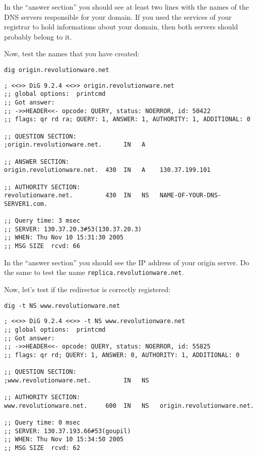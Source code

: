 \documentclass[10pt,a4paper]{article}
\makeatletter
\newenvironment{p}{\@open{P}{}}{\@close{P}}
\newenvironment{p}{}{\par}
\makeatother
\begin{document}
\begin{p}
In the ``answer section'' you should see at least two lines with the names of
the DNS servers responsible for your domain.  If you used the services of your
registrar to hold informations about your domain, then both servers should
probably belong to it.
\end{p}

\begin{p}
Now, test the names that you have created:
\end{p}
\begin{Verbatim}
dig origin.revolutionware.net
\end{Verbatim}

\begin{Verbatim}
; <<>> DiG 9.2.4 <<>> origin.revolutionware.net
;; global options:  printcmd
;; Got answer:
;; ->>HEADER<<- opcode: QUERY, status: NOERROR, id: 50422
;; flags: qr rd ra; QUERY: 1, ANSWER: 1, AUTHORITY: 1, ADDITIONAL: 0

;; QUESTION SECTION:
;origin.revolutionware.net.      IN   A

;; ANSWER SECTION:
origin.revolutionware.net.  430  IN   A    130.37.199.101

;; AUTHORITY SECTION:
revolutionware.net.         430  IN   NS   NAME-OF-YOUR-DNS-SERVER1.com. 

;; Query time: 3 msec
;; SERVER: 130.37.20.3#53(130.37.20.3)
;; WHEN: Thu Nov 10 15:31:30 2005
;; MSG SIZE  rcvd: 66
\end{Verbatim}

\begin{p}
In the ``answer section'' you should see the IP address of your origin
server.  Do the same to test the name \verb!replica.revolutionware.net!.
\end{p}

\begin{p}
Now, let's test if the redirector is correctly registered:
\end{p}

\begin{Verbatim}
dig -t NS www.revolutionware.net
\end{Verbatim}

\begin{Verbatim}
; <<>> DiG 9.2.4 <<>> -t NS www.revolutionware.net
;; global options:  printcmd
;; Got answer:
;; ->>HEADER<<- opcode: QUERY, status: NOERROR, id: 55825
;; flags: qr rd; QUERY: 1, ANSWER: 0, AUTHORITY: 1, ADDITIONAL: 0

;; QUESTION SECTION:
;www.revolutionware.net.         IN   NS

;; AUTHORITY SECTION:
www.revolutionware.net.     600  IN   NS   origin.revolutionware.net.

;; Query time: 0 msec
;; SERVER: 130.37.193.66#53(goupil)
;; WHEN: Thu Nov 10 15:34:50 2005
;; MSG SIZE  rcvd: 62
\end{Verbatim}
\end{document}
